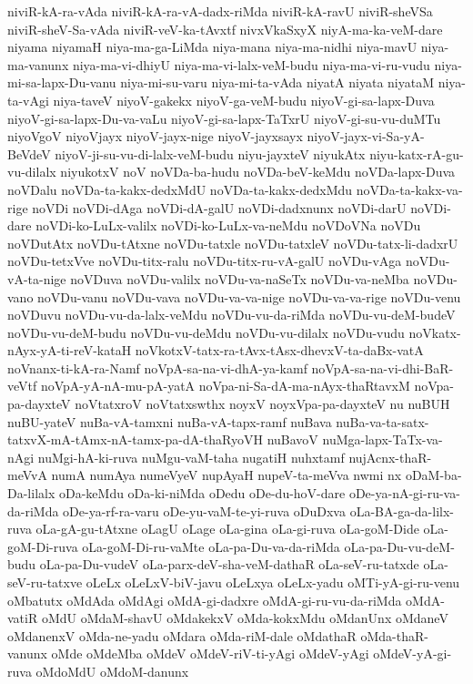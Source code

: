 {niviR-kA-ra-vAda
niviR-kA-ra-vA-dadx-riMda
niviR-kA-ravU
niviR-sheVSa
niviR-sheV-Sa-vAda
niviR-veV-ka-tAvxtf
nivxVkaSxyX
niyA-ma-ka-veM-dare
niyama
niyamaH
niya-ma-ga-LiMda
niya-mana
niya-ma-nidhi
niya-mavU
niya-ma-vanunx
niya-ma-vi-dhiyU
niya-ma-vi-lalx-veM-budu
niya-ma-vi-ru-vudu
niya-mi-sa-lapx-Du-vanu
niya-mi-su-varu
niya-mi-ta-vAda
niyatA
niyata
niyataM
niya-ta-vAgi
niya-taveV
niyoV-gakekx
niyoV-ga-veM-budu
niyoV-gi-sa-lapx-Duva
niyoV-gi-sa-lapx-Du-va-vaLu
niyoV-gi-sa-lapx-TaTxrU
niyoV-gi-su-vu-duMTu
niyoVgoV
niyoVjayx
niyoV-jayx-nige
niyoV-jayxsayx
niyoV-jayx-vi-Sa-yA-BeVdeV
niyoV-ji-su-vu-di-lalx-veM-budu
niyu-jayxteV
niyukAtx
niyu-katx-rA-gu-vu-dilalx
niyukotxV
noV
noVDa-ba-hudu
noVDa-beV-keMdu
noVDa-lapx-Duva
noVDalu
noVDa-ta-kakx-dedxMdU
noVDa-ta-kakx-dedxMdu
noVDa-ta-kakx-va-rige
noVDi
noVDi-dAga
noVDi-dA-galU
noVDi-dadxnunx
noVDi-darU
noVDi-dare
noVDi-ko-LuLx-valilx
noVDi-ko-LuLx-va-neMdu
noVDoVNa
noVDu
noVDutAtx
noVDu-tAtxne
noVDu-tatxle
noVDu-tatxleV
noVDu-tatx-li-dadxrU
noVDu-tetxVve
noVDu-titx-ralu
noVDu-titx-ru-vA-galU
noVDu-vAga
noVDu-vA-ta-nige
noVDuva
noVDu-valilx
noVDu-va-naSeTx
noVDu-va-neMba
noVDu-vano
noVDu-vanu
noVDu-vava
noVDu-va-va-nige
noVDu-va-va-rige
noVDu-venu
noVDuvu
noVDu-vu-da-lalx-veMdu
noVDu-vu-da-riMda
noVDu-vu-deM-budeV
noVDu-vu-deM-budu
noVDu-vu-deMdu
noVDu-vu-dilalx
noVDu-vudu
noVkatx-nAyx-yA-ti-reV-kataH
noVkotxV-tatx-ra-tAvx-tAsx-dhevxV-ta-daBx-vatA
noVnanx-ti-kA-ra-Namf
noVpA-sa-na-vi-dhA-ya-kamf
noVpA-sa-na-vi-dhi-BaR-veVtf
noVpA-yA-nA-mu-pA-yatA
noVpa-ni-Sa-dA-ma-nAyx-thaRtavxM
noVpa-pa-dayxteV
noVtatxroV
noVtatxswthx
noyxV
noyxVpa-pa-dayxteV
nu
nuBUH
nuBU-yateV
nuBa-vA-tamxni
nuBa-vA-tapx-ramf
nuBava
nuBa-va-ta-satx-tatxvX-mA-tAmx-nA-tamx-pa-dA-thaRyoVH
nuBavoV
nuMga-lapx-TaTx-va-nAgi
nuMgi-hA-ki-ruva
nuMgu-vaM-taha
nugatiH
nuhxtamf
nujAcnx-thaR-meVvA
numA
numAya
numeVyeV
nupAyaH
nupeV-ta-meVva
nwmi
nx
oDaM-ba-Da-lilalx
oDa-keMdu
oDa-ki-niMda
oDedu
oDe-du-hoV-dare
oDe-ya-nA-gi-ru-va-da-riMda
oDe-ya-rf-ra-varu
oDe-yu-vaM-te-yi-ruva
oDuDxva
oLa-BA-ga-da-lilx-ruva
oLa-gA-gu-tAtxne
oLagU
oLage
oLa-gina
oLa-gi-ruva
oLa-goM-Dide
oLa-goM-Di-ruva
oLa-goM-Di-ru-vaMte
oLa-pa-Du-va-da-riMda
oLa-pa-Du-vu-deM-budu
oLa-pa-Du-vudeV
oLa-parx-deV-sha-veM-dathaR
oLa-seV-ru-tatxde
oLa-seV-ru-tatxve
oLeLx
oLeLxV-biV-javu
oLeLxya
oLeLx-yadu
oMTi-yA-gi-ru-venu
oMbatutx
oMdAda
oMdAgi
oMdA-gi-dadxre
oMdA-gi-ru-vu-da-riMda
oMdA-vatiR
oMdU
oMdaM-shavU
oMdakekxV
oMda-kokxMdu
oMdanUnx
oMdaneV
oMdanenxV
oMda-ne-yadu
oMdara
oMda-riM-dale
oMdathaR
oMda-thaR-vanunx
oMde
oMdeMba
oMdeV
oMdeV-riV-ti-yAgi
oMdeV-yAgi
oMdeV-yA-gi-ruva
oMdoMdU
oMdoM-danunx
}
